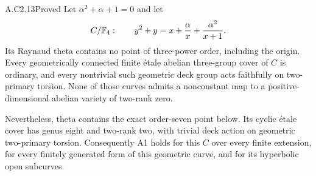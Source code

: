 \begin{claim}{A.C2.13}{Proved}
Let $\alpha^2+\alpha+1=0$ and let
\[
 C/\mathbb F_4:\qquad y^2+y=x+\frac{\alpha}{x}
                         +\frac{\alpha^2}{x+1}.
\]
Its Raynaud theta contains no point of three-power order, including
the origin. Every geometrically connected finite \'etale abelian
three-group cover of $C$ is ordinary, and every nontrivial such
geometric deck group acts faithfully on two-primary torsion.
None of those curves admits a nonconstant map to a positive-dimensional
abelian variety of two-rank zero.

Nevertheless, theta contains the exact order-seven point below.
Its cyclic \'etale cover has genus eight and two-rank two, with
trivial deck action on geometric two-primary torsion. Consequently
A1 holds for this $C$ over every finite extension, for every
finitely generated form of this geometric curve, and for its
hyperbolic open subcurves.
\end{claim}
